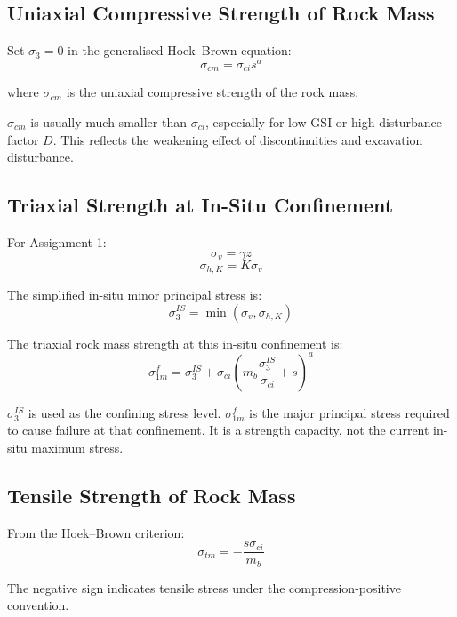 \documentclass[a4paper,12pt]{article}
\begin{document}
\subsection{Uniaxial Compressive Strength of Rock Mass}

Set \(\sigma_3=0\) in the generalised Hoek--Brown equation:
\[
\sigma_{cm}
=
\sigma_{ci}s^a
\]

where \(\sigma_{cm}\) is the uniaxial compressive strength of the rock mass.

\begin{notebox}[Interpretation]
\(\sigma_{cm}\) is usually much smaller than \(\sigma_{ci}\), especially for low GSI or high
disturbance factor \(D\). This reflects the weakening effect of discontinuities and
excavation disturbance.
\end{notebox}

\subsection{Triaxial Strength at In-Situ Confinement}

For Assignment 1:
\[
\sigma_v = \gamma z
\]
\[
\sigma_{h,K}=K\sigma_v
\]

The simplified in-situ minor principal stress is:
\[
\sigma_3^{IS}=\min(\sigma_v,\sigma_{h,K})
\]

The triaxial rock mass strength at this in-situ confinement is:
\[
\sigma_{1m}^f =
\sigma_3^{IS}
+
\sigma_{ci}
\left(
m_b\frac{\sigma_3^{IS}}{\sigma_{ci}} + s
\right)^a
\]

\begin{warnbox}
\(\sigma_3^{IS}\) is used as the confining stress level.  
\(\sigma_{1m}^f\) is the major principal stress required to cause failure at that confinement.
It is a strength capacity, not the current in-situ maximum stress.
\end{warnbox}

\subsection{Tensile Strength of Rock Mass}

From the Hoek--Brown criterion:
\[
\sigma_{tm}
=
-\frac{s\sigma_{ci}}{m_b}
\]

The negative sign indicates tensile stress under the compression-positive convention.
\end{document}
